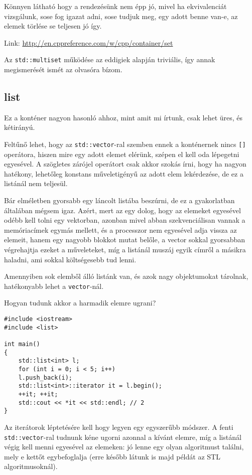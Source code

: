 \documentclass[a4paper,11.5pt,table]{article}
\begin{document}
	Könnyen látható hogy a rendezésünk nem épp jó, mivel ha ekvivalenciát vizsgálunk, sose fog igazat adni, sose tudjuk meg, egy adott benne van-e, az elemek törlése se teljesen jó így.
	
	Link: \url{http://en.cppreference.com/w/cpp/container/set}
	
	\begin{note}
		Az \texttt{std::multiset} működése az eddigiek alapján triviális, így annak megismerését ismét az olvasóra bízom.
	\end{note}
	\subsection{list}
	Ez a konténer nagyon hasonló ahhoz, mint amit mi írtunk, csak lehet üres, és kétirányú.
	\smallskip
	
	Feltűnő lehet, hogy az \texttt{std::vector}-ral szemben ennek a konténernek nincs \texttt{[]} operátora, hiszen mire egy adott elemet elérünk, szépen el kell oda lépegetni egyesével. A szögletes zárójel operátort csak akkor szokás írni, hogy ha nagyon hatékony, lehetőleg konstans műveletigényű az adott elem lekérdezése, de ez a listánál nem teljesül.
	\begin{note}
		Bár elméletben gyorsabb egy láncolt listába beszúrni, de ez a gyakorlatban általában mégsem igaz. Azért, mert az egy dolog, hogy az elemeket egyesével odébb kell tolni egy vektorban, azonban mivel abban szekvenciálisan vannak a memóriacímek egymás mellett, és a processzor nem egyesével adja vissza az elemeit, hanem egy nagyobb blokkot mutat belőle, a vector sokkal gyorsabban végrehajtja ezeket a műveleteket, míg a listánál muszáj egyik címről a másikra haladni, ami sokkal költségesebb tud lenni.
	\end{note}
	\begin{note}
		Amennyiben sok elemből álló listánk van, és azok nagy objektumokat tárolnak, hatékonyabb lehet a \texttt{vector}-nál.
	\end{note}
	Hogyan tudunk akkor a harmadik elemre ugrani?
	\begin{lstlisting}
#include <iostream>
#include <list>

int main()
{
	std::list<int> l;
	for (int i = 0; i < 5; i++)
	l.push_back(i);
	std::list<int>::iterator it = l.begin();
	++it; ++it;
	std::cout << *it << std::endl; // 2
}
	\end{lstlisting}	
	Az iterátorok léptetésére kell hogy legyen egy egyszerűbb módszer. A fenti \texttt{std::vector}-ral tudnunk kéne ugorni azonnal a kívánt elemre, míg a listánál végig kell menni egyesével az elemeken: jó lenne egy olyan algoritmust találni, mely e kettőt egybefoglalja (erre később látunk is majd példát az STL algoritmusoknál).
	
\end{document}
